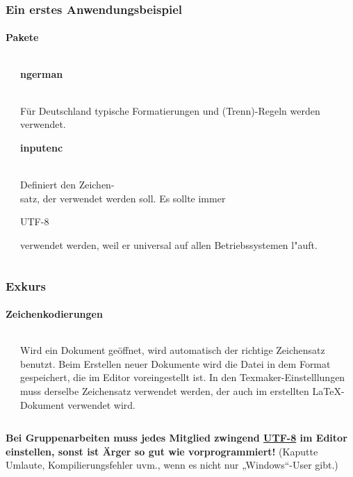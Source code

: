 \begin{frame}
\frametitle{Ein erstes Anwendungsbeispiel}
\framesubtitle{Pakete}
\begin{columns}
\begin{column}{0.6\textwidth}
\begin{ttfamily}\scriptsize

 \normalsize
\end{ttfamily}
\end{column}
\begin{column}{0.4\textwidth}
\begin{ttfamily}\textbf{ngerman}\end{ttfamily}\\
Für Deutschland typische Formatierungen und (Trenn)-Regeln werden verwendet.\\[5mm]

\begin{ttfamily}\textbf{inputenc}\end{ttfamily}\\
Definiert den Zeichen-\\satz, der verwendet werden soll. Es sollte immer
\begin{ttfamily}UTF-8\end{ttfamily} verwendet werden, weil er universal auf
allen Betriebssystemen l"auft.\\
\end{column}
\end{columns}
\end{frame}

\begin{frame}
\frametitle{Exkurs}
\framesubtitle{Zeichenkodierungen}
\begin{columns}
\begin{column}{0.6\textwidth}

\end{column}
\begin{column}{0.4\textwidth}
Wird ein Dokument geöffnet, wird automatisch der richtige Zeichensatz benutzt.
Beim Erstellen neuer Dokumente wird die Datei in dem Format gespeichert, die im
 Editor voreingestellt ist. In den Texmaker-Einstelllungen muss derselbe Zeichensatz verwendet werden, der
auch im erstellten LaTeX-Dokument verwendet wird.\\
\end{column}
\end{columns}
\textbf{Bei Gruppenarbeiten muss jedes Mitglied zwingend \underline{UTF-8} im
Editor einstellen, sonst ist Ärger so gut wie vorprogrammiert!} (Kaputte
Umlaute, Kompilierungsfehler uvm., wenn es nicht nur „Windows“-User gibt.)
\end{frame}

